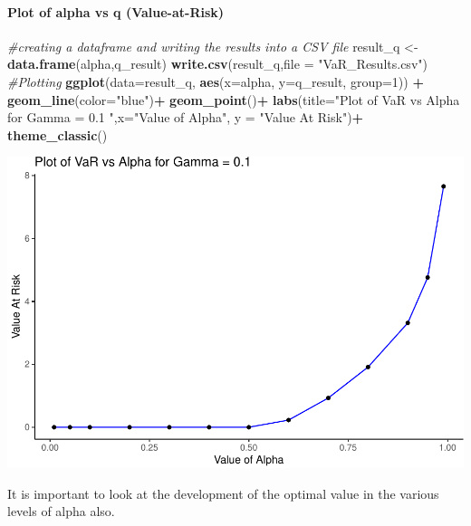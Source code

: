 \documentclass[]{article}
\newenvironment{Shaded}{\begin{snugshade}}{\end{snugshade}}
\newcommand{\KeywordTok}[1]{\textcolor[rgb]{0.13,0.29,0.53}{\textbf{#1}}}
\newcommand{\DataTypeTok}[1]{\textcolor[rgb]{0.13,0.29,0.53}{#1}}
\newcommand{\DecValTok}[1]{\textcolor[rgb]{0.00,0.00,0.81}{#1}}
\newcommand{\StringTok}[1]{\textcolor[rgb]{0.31,0.60,0.02}{#1}}
\newcommand{\CommentTok}[1]{\textcolor[rgb]{0.56,0.35,0.01}{\textit{#1}}}
\newcommand{\OperatorTok}[1]{\textcolor[rgb]{0.81,0.36,0.00}{\textbf{#1}}}
\newcommand{\NormalTok}[1]{#1}
\let\oldparagraph\paragraph
\renewcommand{\paragraph}[1]{\oldparagraph{#1}\mbox{}}
\begin{document}
\paragraph{Plot of alpha vs q
(Value-at-Risk)}\label{plot-of-alpha-vs-q-value-at-risk}

\begin{Shaded}
\begin{Highlighting}[]
\CommentTok{#creating a dataframe and writing the results into a CSV file}
\NormalTok{result_q <-}\StringTok{ }\KeywordTok{data.frame}\NormalTok{(alpha,q_result)}
\KeywordTok{write.csv}\NormalTok{(result_q,}\DataTypeTok{file =} \StringTok{"VaR_Results.csv"}\NormalTok{)}
\CommentTok{#Plotting}
\KeywordTok{ggplot}\NormalTok{(}\DataTypeTok{data=}\NormalTok{result_q, }\KeywordTok{aes}\NormalTok{(}\DataTypeTok{x=}\NormalTok{alpha, }\DataTypeTok{y=}\NormalTok{q_result, }\DataTypeTok{group=}\DecValTok{1}\NormalTok{)) }\OperatorTok{+}
\StringTok{  }\KeywordTok{geom_line}\NormalTok{(}\DataTypeTok{color=}\StringTok{"blue"}\NormalTok{)}\OperatorTok{+}
\StringTok{  }\KeywordTok{geom_point}\NormalTok{()}\OperatorTok{+}
\StringTok{  }\KeywordTok{labs}\NormalTok{(}\DataTypeTok{title=}\StringTok{"Plot of VaR vs Alpha for Gamma = 0.1 "}\NormalTok{,}\DataTypeTok{x=}\StringTok{"Value of Alpha"}\NormalTok{, }\DataTypeTok{y =} \StringTok{"Value At Risk"}\NormalTok{)}\OperatorTok{+}
\StringTok{  }\KeywordTok{theme_classic}\NormalTok{()}
\end{Highlighting}
\end{Shaded}

\includegraphics{Integrated_Management_Formulation_Model_files/figure-latex/unnamed-chunk-5-1.pdf}

It is important to look at the development of the optimal value in the
various levels of alpha also.
\end{document}
